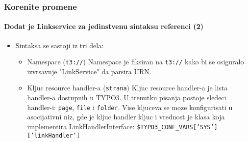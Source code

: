 \begin{frame}[fragile]
	\frametitle{Korenite promene}
	\framesubtitle{Dodat je Linkservice za jedinstvenu sintaksu referenci (2)}

	\begin{itemize}

		\item Sintaksa se sastoji iz tri dela:

			\begin{itemize}

				\item Namespace (\texttt{t3://})\newline
		   			Namespace je fiksiran na \texttt{t3://} kako bi se osiguralo izvrsavnje "LinkService" da parsira URN.
					\newline
				\item Kljuc resource handler-a (\texttt{strana})\newline
   					Kljuc resource handler-a je lista handler-a dostupnih u TYPO3.
					U trenutku pisanja postoje sledeci handler-i: \texttt{page}, \texttt{file} i \texttt{folder}.\newline
					Vise kljuceva se moze konfigurisati u asocijativni niz, gde je kljuc handler kljuc i vrednost je klasa
					koja implementira LinkHandlerInterface:\newline
					\texttt{\$TYPO3\_CONF\_VARS['SYS']['linkHandler']}

			\end{itemize}

	\end{itemize}

\end{frame}

